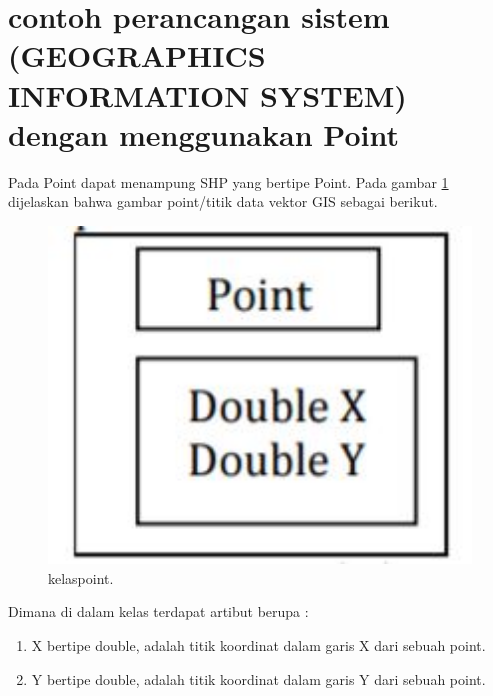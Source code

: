 \section{contoh perancangan sistem (GEOGRAPHICS INFORMATION SYSTEM) dengan menggunakan Point}
Pada Point dapat menampung SHP yang bertipe Point.
Pada gambar \ref{kelaspoint} dijelaskan bahwa gambar point/titik data vektor GIS sebagai berikut.
\begin{figure}[ht]
	\centerline{\includegraphics[width=1\textwidth]{figures/kelaspoint.JPG}}
	\caption{kelaspoint.}
	\label{kelaspoint}
	\end{figure}
Dimana di dalam kelas terdapat artibut berupa :
\begin{enumerate}
\item X bertipe double, adalah titik koordinat dalam garis X dari sebuah point.
\item Y bertipe double, adalah titik koordinat dalam garis Y dari sebuah point.
\end{enumerate}

